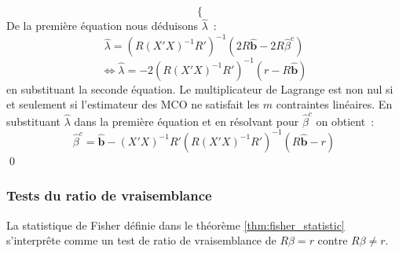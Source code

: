 \documentclass[10pt]{beamer}
\theoremstyle{plain}
\begin{document}
\begin{notes}
\[\begin{cases}
    \end{cases}
  \]
  De la première équation nous déduisons $\hat{\lambda}$~:
  \[
    \hat\lambda = \left( R(X'X)^{-1}R' \right)^{-1}\left( 2R\hat{\mathbf b} - 2R\hat{\beta}^c \right)
  \]
  \[
    \Leftrightarrow \hat{\lambda} = -2 \left( R(X'X)^{-1}R' \right)^{-1}\left( r - R\hat{\mathbf b}\right)
  \]
  en substituant la seconde équation. Le multiplicateur de Lagrange est non nul si et seulement si l'estimateur des MCO ne satisfait les $m$ contraintes linéaires. En substituant $\hat\lambda$ dans la première équation et en résolvant pour $\hat{\beta}^c$ on obtient~:
\[
      \hat{\beta}^c = \hat{\mathbf b} - (X'X)^{-1}R'\left( R(X'X)^{-1}R' \right)^{-1}\left( R\hat{\mathbf b}-r \right)
    \]
    \qed

\end{notes}


\begin{frame}[c]
  \frametitle{Tests du ratio de vraisemblance}

  \begin{theorem}\label{thm:likelihood_ratio_test}
    La statistique de Fisher définie dans le théorème \ref{thm:fisher_statistic} s'interprête comme un test
    de ratio de vraisemblance de $R\beta=r$ contre $R\beta\neq r$.
  \end{theorem}

\end{frame}
\end{document}
